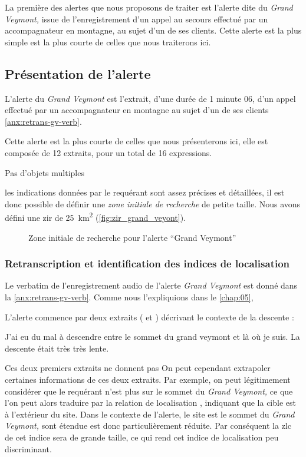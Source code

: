 La première des alertes que nous proposons de traiter est l'alerte
dite du \emph{Grand Veymont,} issue de l'enregistrement d'un appel au
secours effectué par un accompagnateur en montagne, au sujet d'un de
ses clients.
%
Cette alerte est la plus simple est la plus courte de celles que nous
traiterons ici.

\subsection{Présentation de l'alerte}
\label{subsec:9-2-1}

L'alerte du \emph{Grand Veymont} est l'extrait, d'une durée de 1
minute 06, d'un appel effectué par un accompagnateur en montagne au
sujet d'un de ses clients \autoref{anx:retrans-gv-verb}.


Cette alerte est la plus courte de celles que nous présenterons ici,
elle est composée de 12 extraits, pour un total de 16 expressions.



Pas d'objets multiples

les indications données par le requérant sont assez précises et
détaillées, il est donc possible de définir une \emph{zone initiale de
  recherche} de petite taille. Nous avons défini une \ac{zir} de
\SI{25}{\kilo\meter\squared} (\autoref{fig:zir_grand_veyont}).

\begin{figure}
  \centering
  
  \caption{Zone initiale de recherche pour l'alerte \enquote{Grand Veymont}}
  \label{fig:zir_grand_veyont}
\end{figure}


\subsubsection{Retranscription et identification des indices de localisation}
\label{subsec:9-2-1-1}


Le verbatim de l'enregistrement audio de l'alerte \emph{Grand Veymont}
est donné dans la \autoref{anx:retrans-gv-verb}.
%
Comme nous l’expliquions dans le \autoref{chap:05}, 


L'alerte commence par deux extraits ( et ) décrivant
le contexte de la descente :
%
\begin{dialogue}
  \Req {} J'ai eu du mal à descendre entre le sommet du grand
veymont et là où je suis.  La descente était très très lente.
\end{dialogue}
%
Ces deux premiers extraits ne donnent pas
%
On peut cependant extrapoler certaines informations de ces deux
extraits. Par exemple, on peut légitimement considérer que le
requérant n'est plus sur le sommet du \emph{Grand Veymont,} ce que
l'on peut alors traduire par la relation de localisation
, indiquant que la cible est à
l'extérieur du site. Dans le contexte de l'alerte, le site est le
sommet du \emph{Grand Veymont,} sont étendue est donc particulièrement
réduite. Par conséquent la \ac{zlc} de cet indice sera de grande
taille, ce qui rend cet indice de localisation peu discriminant.


